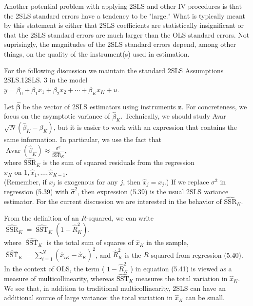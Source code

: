 \documentclass[10pt]{article}
\begin{document}
Another potential problem with applying 2SLS and other IV procedures is that the 2SLS standard errors have a tendency to be "large." What is typically meant by this statement is either that 2SLS coefficients are statistically insignificant or that the 2SLS standard errors are much larger than the OLS standard errors. Not suprisingly, the magnitudes of the 2SLS standard errors depend, among other things, on the quality of the instrument(s) used in estimation.

For the following discussion we maintain the standard 2SLS Assumptions 2SLS.12SLS. 3 in the model\\
$y=\beta_{0}+\beta_{1} x_{1}+\beta_{2} x_{2}+\cdots+\beta_{K} x_{K}+u$.

Let $\hat{\boldsymbol{\beta}}$ be the vector of 2SLS estimators using instruments $\mathbf{z}$. For concreteness, we focus on the asymptotic variance of $\hat{\beta}_{K}$. Technically, we should study Avar $\sqrt{N}\left(\hat{\beta}_{K}-\beta_{K}\right)$, but it is easier to work with an expression that contains the same information. In particular, we use the fact that\\
$\operatorname{Avar}\left(\hat{\beta}_{K}\right) \approx \frac{\sigma^{2}}{\widehat{\mathrm{SSR}}_{K}}$,\\
where $\widehat{\mathrm{SSR}}_{K}$ is the sum of squared residuals from the regression\\
$\hat{x}_{K}$ on $1, \hat{x}_{1}, \ldots, \hat{x}_{K-1}$.\\
(Remember, if $x_{j}$ is exogenous for any $j$, then $\hat{x}_{j}=x_{j}$.) If we replace $\sigma^{2}$ in regression (5.39) with $\hat{\sigma}^{2}$, then expression (5.39) is the usual 2SLS variance estimator. For the current discussion we are interested in the behavior of $\widehat{\mathrm{SSR}}_{K}$.

From the definition of an $R$-squared, we can write\\
$\widehat{\operatorname{SSR}}_{K}=\widehat{\operatorname{SST}}_{K}\left(1-\hat{R}_{K}^{2}\right)$,\\
where $\widehat{\operatorname{SST}}_{K}$ is the total sum of squares of $\hat{x}_{K}$ in the sample, $\widehat{\operatorname{SST}}_{K}= \sum_{i=1}^{N}\left(\hat{x}_{i K}-\overline{\hat{x}}_{K}\right)^{2}$, and $\hat{R}_{K}^{2}$ is the $R$-squared from regression (5.40). In the context of OLS, the term ( $1-\hat{R}_{K}^{2}$ ) in equation (5.41) is viewed as a measure of multicollinearity, whereas $\widehat{\mathrm{SST}}_{K}$ measures the total variation in $\hat{x}_{K}$. We see that, in addition to traditional multicollinearity, 2SLS can have an additional source of large variance: the total variation in $\hat{x}_{K}$ can be small.
\end{document}

